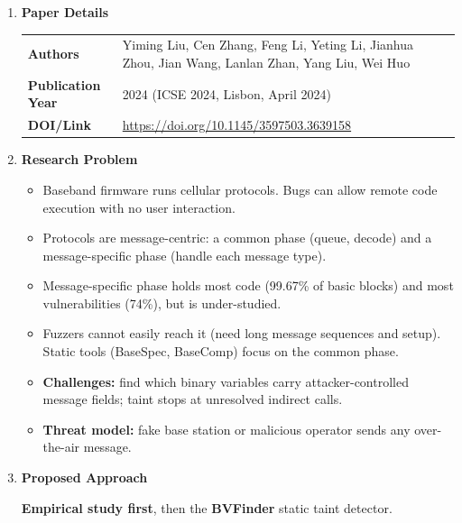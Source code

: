 \documentclass[11pt,a4paper]{article}
\newcommand{\entrypart}[1]{\textbf{\color{accent}#1}\par\vspace{2pt}}
\begin{document}
\begin{enumerate}

    \item \entrypart{Paper Details}

    \begin{tabular}{@{}>{\bfseries}p{3.2cm} p{11.5cm}@{}}
        Authors          & Yiming Liu, Cen Zhang, Feng Li, Yeting Li, Jianhua Zhou, Jian Wang, Lanlan Zhan, Yang Liu, Wei Huo \\[2pt]
        Publication Year & 2024 (ICSE 2024, Lisbon, April 2024) \\[2pt]
        DOI/Link         & \url{https://doi.org/10.1145/3597503.3639158}
    \end{tabular}

    \item \entrypart{Research Problem}

    \begin{itemize}
        \item Baseband firmware runs cellular protocols. Bugs can allow remote code execution with no user interaction.
        \item Protocols are message-centric: a common phase (queue, decode) and a message-specific phase (handle each message type).
        \item Message-specific phase holds most code (99.67\% of basic blocks) and most vulnerabilities (74\%), but is under-studied.
        \item Fuzzers cannot easily reach it (need long message sequences and setup). Static tools (BaseSpec, BaseComp) focus on the common phase.
        \item \textbf{Challenges:} find which binary variables carry attacker-controlled message fields; taint stops at unresolved indirect calls.
        \item \textbf{Threat model:} fake base station or malicious operator sends any over-the-air message.
    \end{itemize}

    \item \entrypart{Proposed Approach}

    \textbf{Empirical study first}, then the \textbf{BVFinder} static taint detector.


\end{enumerate}
\end{document}
